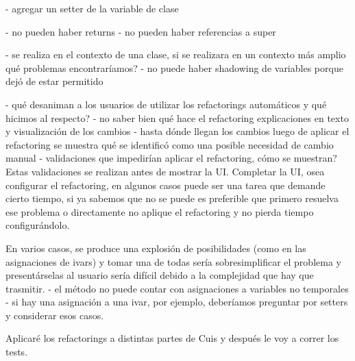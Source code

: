 - agregar un setter de la variable de clase

- no pueden haber returns
- no pueden haber referencias a super



- se realiza en el contexto de una clase, si se realizara en un contexto más amplio qué problemas encontraríamos?
- no puede haber shadowing de variables porque dejó de estar permitido


- qué desaniman a los usuarios de utilizar los refactorings automáticos y qué hicimos al respecto?
    - no saber bien qué hace el refactoring
    explicaciones en texto y visualización de los cambios
    - hasta dónde llegan los cambios
    luego de aplicar el refactoring se muestra qué se identificó como una posible necesidad de cambio manual
- validaciones que impedirían aplicar el refactoring, cómo se muestran? Estas validaciones se
realizan antes de mostrar la UI. Completar la UI, osea configurar el refactoring, en algunos
casos puede ser una tarea que demande cierto tiempo, si ya sabemos que no se puede es preferible
que primero resuelva ese problema o directamente no aplique el refactoring y no pierda tiempo
configurándolo.



En varios casos, se produce una explosión de posibilidades (como en las asignaciones de ivars) y
tomar una de todas sería sobresimplificar el problema y presentárselas al usuario sería
difícil debido a la complejidad que hay que trasmitir.
- el método no puede contar con asignaciones a variables no temporales
- si hay una asignación a una ivar, por ejemplo, deberíamos preguntar por setters y considerar esos
casos.



Aplicaré los refactorings a distintas partes de Cuis y después le voy a correr los tests.